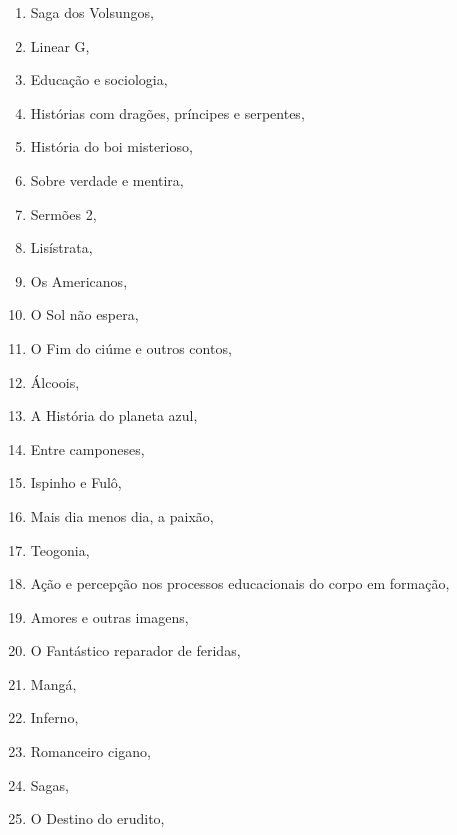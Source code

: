 \begin{multicols}{2}
\begin{enumerate}
\item Saga dos Volsungos, {}
\item Linear G, {}
\item Educação e sociologia, {}
\item Histórias com dragões, príncipes e serpentes, {}
\item História do boi misterioso, {}
\item Sobre verdade e mentira, {}
\item Sermões 2, {}
\item Lisístrata, {}
\item Os Americanos, {}
\item O Sol não espera, {}
\item O Fim do ciúme e outros contos, {}
\item Álcoois, {}
\item A História do planeta azul, {}
\item Entre camponeses, {}
\item Ispinho e Fulô, {}
\item Mais dia menos dia, a paixão, {}
\item Teogonia, {}
\item Ação e percepção nos processos educacionais do corpo em formação, {}
\item Amores e outras imagens, {}
\item O Fantástico reparador de feridas, {}
\item Mangá, {}
\item Inferno, {}
\item Romanceiro cigano, {}
\item Sagas, {}
\item O Destino do erudito, {}

\end{enumerate}
\end{multicols}
